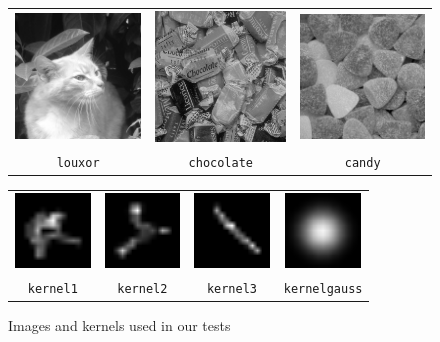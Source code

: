 
    \begin{figure}
    \centering
    \begin{tabular}{c c c}\includegraphics[width=4cm]{images/louxor} 
& \includegraphics[width=4cm]{images/chocolate} 
& \includegraphics[width=4cm]{images/candy} 
\\ 
\texttt{louxor} 
& \texttt{chocolate} 
& \texttt{candy} 

    \end{tabular}
    \begin{tabular}{c c c c}\includegraphics[width=2cm]{images/kernel1} 
& \includegraphics[width=2cm]{images/kernel2} 
& \includegraphics[width=2cm]{images/kernel3} 
& \includegraphics[width=2cm]{images/kernelgauss} 
\\ 
\texttt{kernel1} 
& \texttt{kernel2} 
& \texttt{kernel3} 
& \texttt{kernelgauss} 

\end{tabular}
\caption{Images and kernels used in our tests}
\end{figure}
